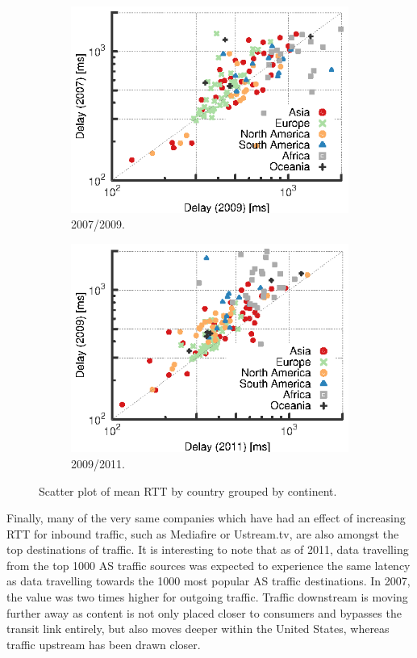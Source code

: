 \begin{figure}
    \centering
    \begin{subfigure}[b]{0.5\linewidth}
        \includegraphics{figures/malawi/rtt_comp_07_09}
        \centering
        \caption{2007/2009.}
    \end{subfigure}%
    \begin{subfigure}[b]{0.5\linewidth}
        \centering
        \includegraphics{figures/malawi/rtt_comp_09_11}
        \caption{2009/2011.}
    \end{subfigure}%
    \caption{Scatter plot of mean \acs{RTT} by country grouped by continent.\label{fig:rtt_comp}}
\end{figure}

Finally, many of the very same companies which have had an effect of increasing \ac{RTT} for inbound traffic, such as Mediafire or Ustream.tv, are also amongst the top destinations of traffic. 
It is interesting to note that as of 2011, data travelling from the top 1000 \ac{AS} traffic sources was expected to experience the same latency as data travelling towards the 1000 most popular \ac{AS} traffic destinations. 
In 2007, the value was two times higher for outgoing traffic.
Traffic downstream is moving further away as content is not only placed closer to consumers and bypasses the transit link entirely, but also moves deeper within the United States, whereas traffic upstream has been drawn closer. 

